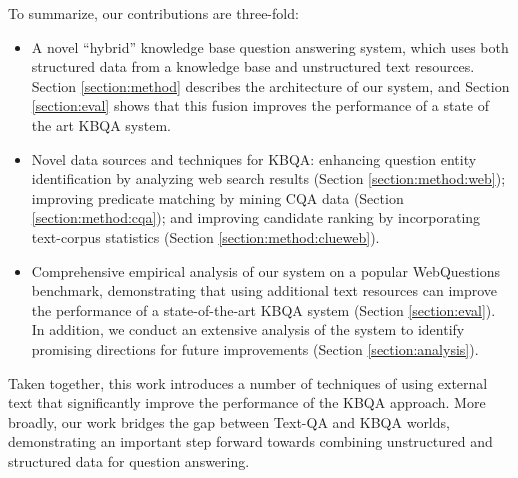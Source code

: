 To summarize, our contributions are three-fold:
\begin{itemize} %
\item A novel ``hybrid'' knowledge base question answering system, which uses both structured data from a knowledge base and unstructured text resources. Section \ref{section:method} describes the architecture of our system, and Section \ref{section:eval} shows that this fusion improves the performance of a state of the art KBQA system.
\item Novel data sources and techniques for KBQA: enhancing question entity identification by analyzing web search results (Section \ref{section:method:web}); improving predicate matching by mining CQA data (Section \ref{section:method:cqa}); and improving candidate ranking by incorporating text-corpus statistics (Section \ref{section:method:clueweb}).
\item Comprehensive empirical analysis of our system on a popular WebQuestions benchmark, demonstrating that using additional text resources can improve the performance of a state-of-the-art KBQA system (Section \ref{section:eval}). In addition, we conduct an extensive analysis of the system to identify promising directions for future improvements (Section \ref{section:analysis}).
\end{itemize}

Taken together, this work introduces a number of techniques of using external text that significantly improve the performance of the KBQA approach.
More broadly, our work bridges the gap between Text-QA and KBQA worlds, demonstrating an important step forward towards combining unstructured and structured data for question answering.




